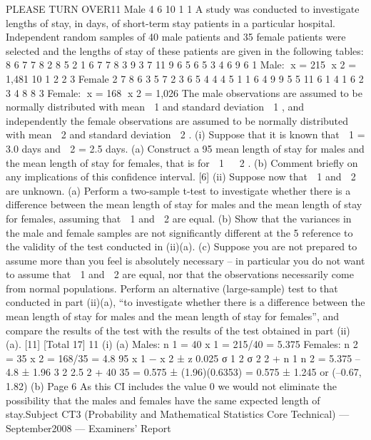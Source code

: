 PLEASE TURN OVER11
Male
4
6
10
1
1
A study was conducted to investigate lengths of stay, in days, of short-term stay
patients in a particular hospital. Independent random samples of 40 male patients and
35 female patients were selected and the lengths of stay of these patients are given in
the following tables:
8
6
7
7
8
2
8
5
2
1
6
7
7
8
3
9
3
7
11
9
6
5
6
5
3
4
6
9
6
1
Male: x = 215 x 2 = 1,481
10
1
2
2
3
Female
2
7
8
6
3
5
7
2
3
6
5
4
4
4
5
1
1
6
4
9
9
5
5
11
6
1
4
1
6
2
3
4
8
8
3
Female: x = 168 x 2 = 1,026
The male observations are assumed to be normally distributed with mean  1 and
standard deviation  1 , and independently the female observations are assumed to be
normally distributed with mean  2 and standard deviation  2 .
(i)
Suppose that it is known that  1 = 3.0 days and  2 = 2.5 days.
(a) Construct a 95%
mean length of stay for males and the mean length of stay for females,
that is for  1   2 .
(b) Comment briefly on any implications of this confidence interval.
[6]
(ii)
Suppose now that  1 and  2 are unknown.
(a) Perform a two-sample t-test to investigate whether there is a difference
between the mean length of stay for males and the mean length of stay
for females, assuming that  1 and  2 are equal.
(b) Show that the variances in the male and female samples are not
significantly different at the 5%
reference to the validity of the test conducted in (ii)(a).
(c) Suppose you are not prepared to assume more than you feel is
absolutely necessary – in particular you do not want to assume that
 1 and  2 are equal, nor that the observations necessarily come from
normal populations.
Perform an alternative (large-sample) test to that conducted in part
(ii)(a), “to investigate whether there is a difference between the mean
length of stay for males and the mean length of stay for females”, and
compare the results of the test with the results of the test obtained in
part (ii)(a).
[11]
[Total 17]
11
(i)
(a)
Males: n 1 = 40
x 1 = 215/40 = 5.375
Females: n 2 = 35 x 2 = 168/35 = 4.8
95%
x 1 − x 2 ± z 0.025
σ 1 2 σ 2 2
+
n 1 n 2
= 5.375 – 4.8 ± 1.96
3 2 2.5 2
+
40 35
= 0.575 ± (1.96)(0.6353)
= 0.575 ± 1.245 or (–0.67, 1.82)
(b)
Page 6
As this CI includes the value 0 we would not eliminate the possibility
that the males and females have the same expected length of stay.Subject CT3 (Probability and Mathematical Statistics Core Technical) — September2008 — Examiners’ Report
